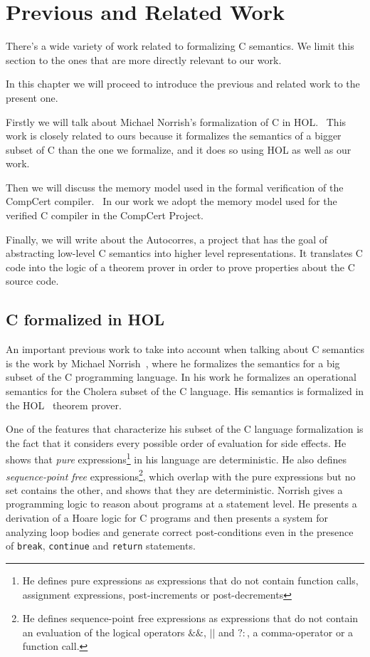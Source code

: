 \chapter{Previous and Related Work}\label{chapter:previous}

There's a wide variety of work related to formalizing C semantics.
We limit this section to the ones that are more directly relevant to our work.

In this chapter we will proceed to introduce the previous and related work to the present one.

Firstly we will talk about Michael Norrish's formalization of C in HOL.~\parencite{norrish}
This work is closely related to ours because it formalizes the semantics of a bigger subset of C than the one we formalize, and it does so using HOL as well as our work.

Then we will discuss the memory model used in the formal verification of the CompCert compiler.~\parencite{leroy-blazy-memory-model}
In our work we adopt the memory model used for the verified C compiler in the CompCert Project.

Finally, we will write about the Autocorres, a project that has the goal of abstracting low-level C semantics into higher level representations.
It translates C code into the logic of a theorem prover in order to prove properties about the C source code.

\section{C formalized in HOL}

An important previous work to take into account when talking about C semantics is the work by Michael Norrish~\parencite{norrish}, where he formalizes the semantics for a big subset of the C programming language.
In his work he formalizes an operational semantics for the Cholera subset of the C language.
His semantics is formalized in the HOL~\parencite{hol-doc} theorem prover.

One of the features that characterize his subset of the C language formalization is the fact that it considers every possible order of evaluation for side effects.
He shows that \textit{pure} expressions\footnote{He defines pure expressions as expressions that do not contain function calls, assignment expressions, post-increments or post-decrements} in his language are deterministic.
He also defines \textit{sequence-point free} expressions\footnote{He defines sequence-point free expressions as expressions that do not contain an evaluation of the logical operators $\&\&$, $||$ and $?:$, a comma-operator or a function call.}, which overlap with the pure expressions but no set contains the other, and shows that they are deterministic.
Norrish gives a programming logic to reason about programs at a statement level.
He presents a derivation of a Hoare logic for C programs and then presents a system for analyzing loop bodies and generate correct post-conditions even in the presence of \verb|break|, \verb|continue| and \verb|return| statements.

